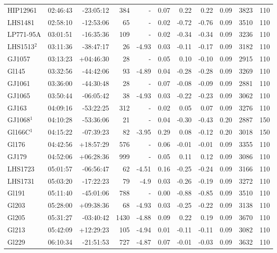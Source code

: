 \documentclass[referee]{aa}
\begin{document}
{\begin{longtable}{l r r r r r r r r r r}
HIP12961 & 02:46:43 & -23:05:12 & 384 &    - & 0.07 & 0.22 & 0.22 & 0.09 & 3823 &  110 \\
LHS1481 & 02:58:10 & -12:53:06 & 65 &    - & 0.02 & -0.72 & -0.76 & 0.09 & 3510 &  110 \\
LP771-95A & 03:01:51 & -16:35:36 & 109 &    - & 0.02 & -0.34 & -0.34 & 0.09 & 3236 &  110 \\
LHS1513$^2$ & 03:11:36 & -38:47:17 & 26 & -4.93 & 0.03 & -0.11 & -0.17 & 0.09 & 3182 &  110 \\
GJ1057 & 03:13:23 & +04:46:30 & 28 &    - & 0.05 & 0.10 & -0.10 & 0.09 & 2915 &  110 \\
Gl145 & 03:32:56 & -44:42:06 & 93 & -4.89 & 0.04 & -0.28 & -0.28 & 0.09 & 3269 &  110 \\
GJ1061 & 03:36:00 & -44:30:48 & 28 &    - & 0.07 & -0.08 & -0.09 & 0.09 & 2881 &  110 \\
GJ1065 & 03:50:44 & -06:05:42 & 38 & -4.93 & 0.03 & -0.22 & -0.23 & 0.09 & 3062 &  110 \\
GJ163 & 04:09:16 & -53:22:25 & 312 &    - & 0.02 & 0.05 & 0.07 & 0.09 & 3276 &  110 \\
GJ1068$^1$ & 04:10:28 & -53:36:06 & 21 &    - & 0.04 & -0.30 & -0.43 & 0.20 & 2887 &  150 \\
Gl166C$^1$ & 04:15:22 & -07:39:23 & 82 & -3.95 & 0.29 & 0.08 & -0.12 & 0.20 & 3018 &  150 \\
Gl176 & 04:42:56 & +18:57:29 & 576 &    - & 0.06 & -0.01 & -0.01 & 0.09 & 3355 &  110 \\
GJ179 & 04:52:06 & +06:28:36 & 999 &    - & 0.05 & 0.11 & 0.12 & 0.09 & 3086 &  110 \\
LHS1723 & 05:01:57 & -06:56:47 & 62 & -4.51 & 0.16 & -0.25 & -0.24 & 0.09 & 3166 &  110 \\
LHS1731 & 05:03:20 & -17:22:23 & 79 & -4.9 & 0.03 & -0.26 & -0.19 & 0.09 & 3272 &  110 \\
Gl191 & 05:11:40 & -45:01:06 & 788 &    - & 0.00 & -0.88 & -0.85 & 0.09 & 3510 &  110 \\
Gl203 & 05:28:00 & +09:38:36 & 68 & -4.93 & 0.03 & -0.25 & -0.22 & 0.09 & 3138 &  110 \\
Gl205 & 05:31:27 & -03:40:42 & 1430 & -4.88 & 0.09 & 0.22 & 0.19 & 0.09 & 3670 &  110 \\
Gl213 & 05:42:09 & +12:29:23 & 105 & -4.94 & 0.01 & -0.11 & -0.11 & 0.09 & 3082 &  110 \\
Gl229 & 06:10:34 & -21:51:53 & 727 & -4.87 & 0.07 & -0.01 & -0.03 & 0.09 & 3632 &  110 \\

\end{longtable}}
\end{document}
